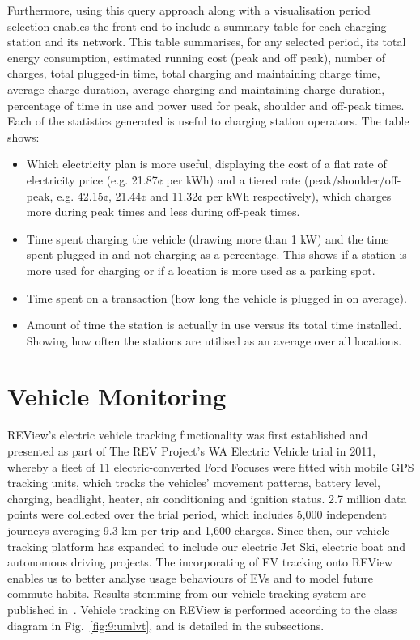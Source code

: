 Furthermore, using this query approach along with a visualisation period selection enables the front end to include a summary table for each charging station and its network. This table summarises, for any selected period, its total energy consumption, estimated running cost (peak and off peak), number of charges, total plugged-in time, total charging and maintaining charge time, average charge duration, average charging and maintaining charge duration, percentage of time in use and power used for peak, shoulder and off-peak times. Each of the statistics generated is useful to charging station operators.  The table shows:
\begin{itemize}
	\item Which electricity plan is more useful, displaying the cost of a flat rate of electricity price (e.g. 21.87¢ per kWh) and a tiered rate (peak/shoulder/off-peak, e.g. 42.15¢, 21.44¢ and 11.32¢ per kWh respectively), which charges more during peak times and less during off-peak times.
	\item Time spent charging the vehicle (drawing more than 1 kW) and the time spent plugged in and not charging as a percentage. This shows if a station is more used for charging or if a location is more used as a parking spot. 
	\item Time spent on a transaction (how long the vehicle is plugged in on average).
	\item Amount of time the station is actually in use versus its total time installed. Showing how often the stations are utilised as an average over all locations.
\end{itemize}

\section{Vehicle Monitoring}
\label{sec:9:vm}
REView’s electric vehicle tracking functionality was first established and presented as part of The REV Project’s WA Electric Vehicle trial in 2011, whereby a fleet of 11 electric-converted Ford Focuses were fitted with mobile GPS tracking units, which tracks the vehicles’ movement patterns, battery level, charging, headlight, heater, air conditioning and ignition status. 2.7 million data points were collected over the trial period, which includes 5,000 independent journeys averaging 9.3 km per trip and 1,600 charges. Since then, our vehicle tracking platform has expanded to include our electric Jet Ski, electric boat and autonomous driving projects. The incorporating of EV tracking onto REView enables us to better analyse usage behaviours of EVs and to model future commute habits. Results stemming from our vehicle tracking system are published in~\cite{speidel_analysis_2012}. Vehicle tracking on REView is performed according to the class diagram in Fig.~\ref{fig:9:umlvt}, and is detailed in the subsections.

